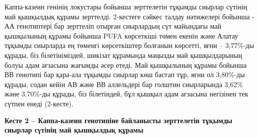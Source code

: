 Каппа-казеин генінің локустары бойынша зерттелетін тұқымды сиырлар
сүтінің май қышқылдық құрамы зерттелді. 2-кестеге сәйкес талдау
нәтижелері бойынша - АА генотиптері бар зерттеліп отырған сиырлардың сүт
майындағы май қышқылының құрамы бойынша PUFA көрсеткіші төмен екенін
және Алатау тұқымды сиырларда ең төменгі көрсеткіштер болғанын көрсетті,
яғни -- 3,77\%-ды құрады, біз білетініміздей, шикізат құрамында маңызды
май қышқылдарының болуы адам ағзасына жағымды әсер етеді. Май қышқылының
құрамы бойынша ВВ генотипі бар қара-ала тұқымды сиырлар көш бастап тұр,
яғни ол 3,80\%-ды құрады, содан кейін АВ және ВВ аллельдері бар голштин
сиырларында 3,62\% және 3,70\%-ды құрады, біз білетіндей, бұл қышқыл
адам ағзасына негізінен тек сүтпен енеді (2-кесте).

{\bfseries Кесте 2 -- Каппа-казеин генотипіне байланысты зерттелетін
тұқымды сиырлар сүтінің май қышқылдық құрамы}

